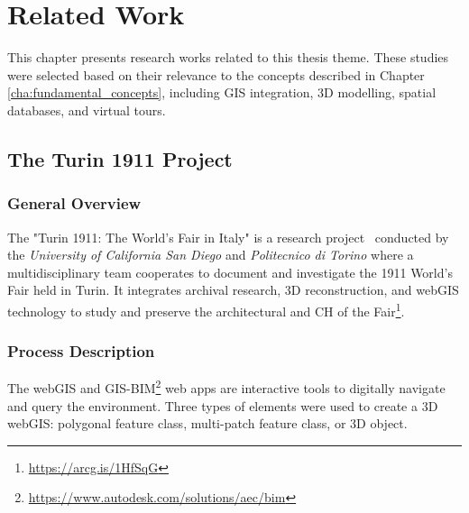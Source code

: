 
%


\chapter{Related Work}
\label{cha:related_work}

This chapter presents research works related to this thesis theme.
These studies were selected based on their relevance to the concepts described in Chapter \ref{cha:fundamental_concepts}, including \gls{GIS} integration, \gls{3D} modelling, spatial databases, and virtual tours.

\section{The Turin 1911 Project}
\label{sec:turin_project} 

\subsection*{General Overview}

The "Turin 1911: The World's Fair in Italy" is a research project~\cite{article} conducted by the \textit{University of California San Diego} and  \textit{Politecnico di Torino} where a multidisciplinary team cooperates to document and investigate the 1911 World’s Fair held in Turin.
It integrates archival research, \gls{3D} reconstruction, and web\gls{GIS} technology to study and preserve the architectural and \gls{CH} of the Fair\footnote{\url{https://arcg.is/1HfSqG}}.

\subsection*{Process Description}

The web\gls{GIS} and \gls{GIS}-\gls{BIM}\footnote{\url{https://www.autodesk.com/solutions/aec/bim}} web apps are interactive tools to digitally navigate and query the environment. 
Three types of elements were used to create a \gls{3D} web\gls{GIS}: polygonal feature class, multi-patch feature class, or \gls{3D} object.


